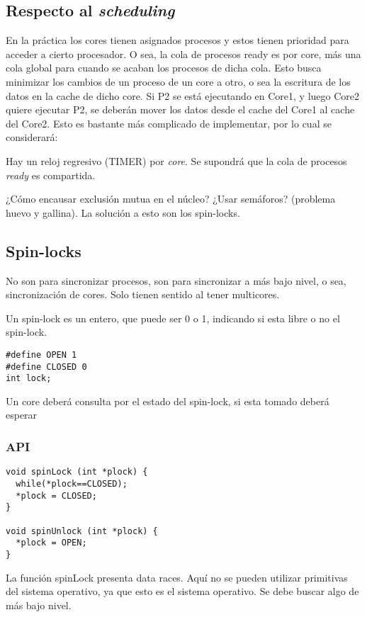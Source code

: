 \subsection{Respecto al \textit{scheduling}}

En la práctica los cores tienen asignados procesos y estos tienen prioridad para acceder a cierto procesador. O sea, la cola de procesos ready es por core, más una cola global para cuando se acaban los procesos de dicha cola. Esto busca minimizar los cambios de un proceso de un core a otro, o sea la escritura de los datos en la cache de dicho core. Si P2 se está ejecutando en Core1, y luego Core2 quiere ejecutar P2, se deberán mover los datos desde el cache del Core1 al cache del Core2. Esto es bastante más complicado de implementar, por lo cual se considerará:

Hay un reloj regresivo (TIMER) por \textit{core}.
Se supondrá que la cola de procesos \textit{ready} es compartida.

¿Cómo encausar exclusión mutua en el núcleo? ¿Usar semáforos? (problema huevo y gallina). La solución a esto son los spin-locks.

\subsection{Spin-locks}

No son para sincronizar procesos, son para sincronizar a más bajo nivel, o sea, sincronización de cores. Solo tienen sentido al tener multicores.

Un spin-lock es un entero, que puede ser 0 o 1, indicando si esta libre o no el spin-lock.

\begin{verbatim}
#define OPEN 1
#define CLOSED 0
int lock;
\end{verbatim}

Un core deberá consulta por el estado del spin-lock, si esta tomado deberá esperar

\subsubsection{API}

\begin{verbatim}
void spinLock (int *plock) {
  while(*plock==CLOSED);
  *plock = CLOSED;
}

void spinUnlock (int *plock) {
  *plock = OPEN;
}
\end{verbatim}

La función spinLock presenta data races. Aquí no se pueden utilizar primitivas del sistema operativo, ya que esto es el sistema operativo. Se debe buscar algo de más bajo nivel.

